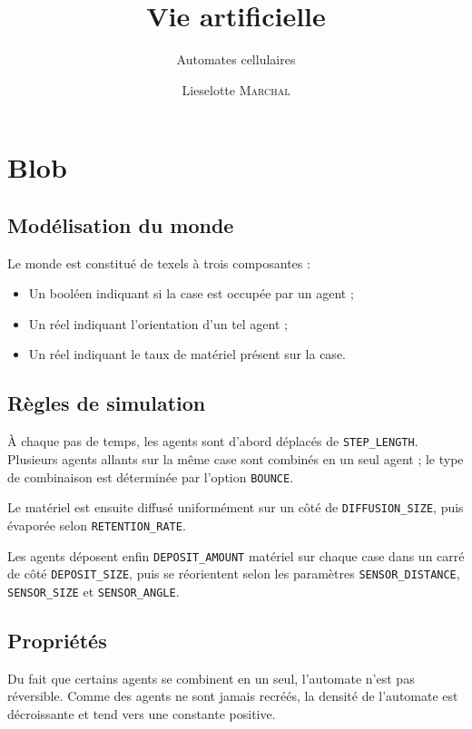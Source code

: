 \documentclass[11pt]{scrartcl}
\title{Vie artificielle}
\subtitle{Automates cellulaires}
\author{Lieselotte \textsc{Marchal}}
\begin{document}
    \maketitle
    
    \section{Blob}
        \subsection{Modélisation du monde}
            Le monde est constitué de texels à trois composantes :
            \begin{itemize}
                \item Un booléen indiquant si la case est occupée par un agent ;
                \item Un réel indiquant l'orientation d'un tel agent ;
                \item Un réel indiquant le taux de matériel présent sur la case.
            \end{itemize}
        
        \subsection{Règles de simulation}
            À chaque pas de temps, les agents sont d'abord déplacés de \texttt{STEP\_LENGTH}.
            Plusieurs agents allants sur la même case sont combinés en un seul agent ; le type de combinaison est déterminée par l'option \texttt{BOUNCE}.
            
            Le matériel est ensuite diffusé uniformément sur un côté de \texttt{DIFFUSION\_SIZE}, puis évaporée selon \texttt{RETENTION\_RATE}.
            
            Les agents déposent enfin \texttt{DEPOSIT\_AMOUNT} matériel sur chaque case dans un carré de côté \texttt{DEPOSIT\_SIZE}, puis se réorientent
            selon les paramètres \texttt{SENSOR\_DISTANCE}, \texttt{SENSOR\_SIZE} et \texttt{SENSOR\_ANGLE}.
        
        \subsection{Propriétés}
            Du fait que certains agents se combinent en un seul, l'automate n'est pas réversible.
            Comme des agents ne sont jamais recréés, la densité de l'automate est décroissante et tend vers une constante positive.
        
\end{document}
